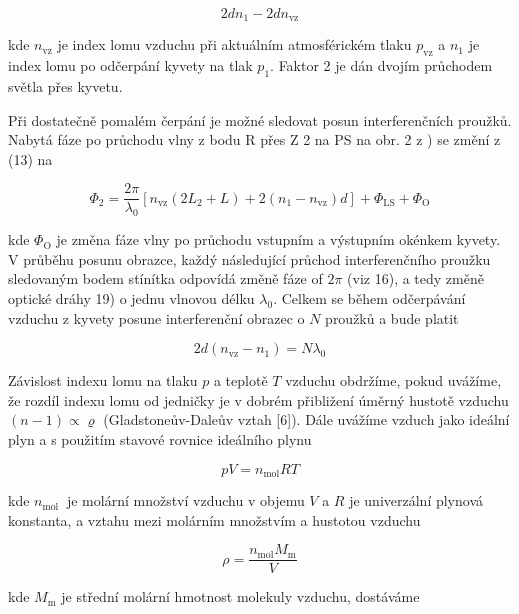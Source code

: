 \documentclass[czech,11pt,a4paper]{article}
\begin{document}
\begin{multicols}{2}
	\begin{equation}
		2 d n_{1}-2 d n_{\mathrm{vz}}
	\end{equation}
	
	
	kde $n_{\mathrm{vz}}$ je index lomu vzduchu při aktuálním atmosférickém tlaku $p_{\mathrm{vz}}$ a $n_{1}$ je index lomu po odčerpání kyvety na tlak $p_{1}$. Faktor 2 je dán dvojím průchodem světla přes kyvetu.
	
	Při dostatečně pomalém čerpání je možné sledovat posun interferenčních proužků. Nabytá fáze po průchodu vlny z bodu R přes Z 2 na PS na obr. 2 z ) se změní z (13) na
	
	
	\begin{equation}
		\Phi_{2}=\frac{2 \pi}{\lambda_{0}}\left[n_{\mathrm{vz}}\left(2 L_{2}+L\right)+2\left(n_{1}-n_{\mathrm{vz}}\right) d\right]+\Phi_{\mathrm{LS}}+\Phi_{\mathrm{O}}
	\end{equation}
	
	
	kde $\Phi_{\mathrm{O}}$ je změna fáze vlny po průchodu vstupním a výstupním okénkem kyvety. V průběhu posunu obrazce, každý následující průchod interferenčního proužku sledovaným bodem stínítka odpovídá změně fáze of $2 \pi$ (viz 16), a tedy změně optické dráhy 19) o jednu vlnovou délku $\lambda_{0}$. Celkem se během odčerpávání vzduchu z kyvety posune interferenční obrazec o $N$ proužků a bude platit
	
	
	\begin{equation}
		2 d\left(n_{\mathrm{vz}}-n_{1}\right)=N \lambda_{0}
	\end{equation}
	
	
	Závislost indexu lomu na tlaku $p$ a teplotě $T$ vzduchu obdržíme, pokud uvážíme, že rozdíl indexu lomu od jedničky je v dobrém přibližení úměrný hustotě vzduchu $(n-1) \propto \varrho$ (Gladstoneův-Daleův vztah [6]). Dále uvážíme vzduch jako ideální plyn a s použitím stavové rovnice ideálního plynu
	
	
	\begin{equation}
		p V=n_{\mathrm{mol}} R T
	\end{equation}
	
	
	kde $n_{\text {mol }}$ je molární množství vzduchu v objemu $V$ a $R$ je univerzální plynová konstanta, a vztahu mezi molárním množstvím a hustotou vzduchu
	
	
	\begin{equation}
		\rho=\frac{n_{\mathrm{mol}} M_{\mathrm{m}}}{V}
	\end{equation}
	
	
	kde $M_{\mathrm{m}}$ je střední molární hmotnost molekuly vzduchu, dostáváme
	

\end{multicols}
\end{document}
